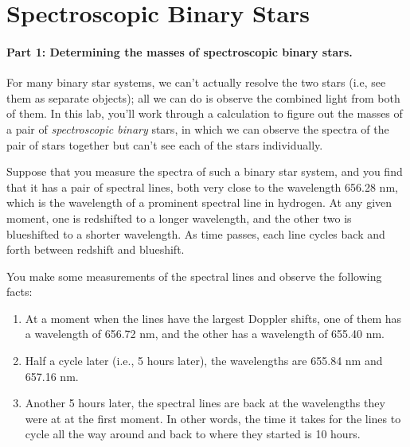 \section{Spectroscopic Binary Stars}

\makelabheader


\paragraph{Part 1: Determining the masses of spectroscopic
binary stars.}

For many binary star systems, we can't actually resolve the two stars (i.e,
see
them as separate objects); all we can do is observe the combined light
from both of them. 
In this lab, you'll work through a calculation to figure
out the masses of a pair of \textit{spectroscopic binary} stars,
in which we can observe the spectra of the pair of stars together
but can't see each of the stars individually.

Suppose that you measure the spectra of such a binary star system, and you
find that it has a pair of spectral lines, both very close to the wavelength
656.28 nm, which is the wavelength of a prominent spectral line in hydrogen.
At any given moment, one is redshifted to a longer wavelength,
and the other two is blueshifted to a shorter wavelength. As time passes,
each line cycles back and forth between redshift and blueshift.

You make some measurements of the spectral lines and observe the 
following facts:

\begin{enumerate}
\item At a moment when the lines have the largest Doppler shifts,
one of them has a wavelength of 656.72 nm, and the other
has a wavelength of 655.40 nm. 
\item Half a cycle later (i.e., 5 hours later),
the wavelengths are 655.84 nm and 657.16 nm.
\item Another 5 hours later, the spectral lines are back at the wavelengths
they were at at the first moment. In other words, the time
it takes for the lines to cycle all the way around and back to where
they started is 10 hours.
\end{enumerate}

